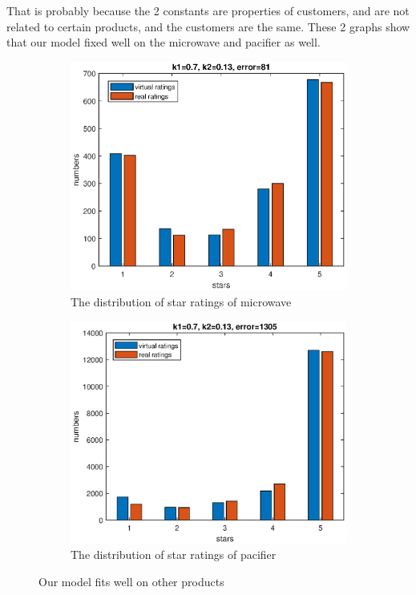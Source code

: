 \documentclass[12pt]{article}  %
\begin{document}
That is probably because the 2 constants are properties of customers, and are not related to certain products, and the customers are the same. These 2 graphs show that our model fixed well on the microwave and pacifier as well.


\begin{figure}[H]
  \centering
  \begin{subfigure}{.5\textwidth}
    \centering
    \includegraphics[width=\linewidth]{Q4picture/microwave}
    \caption{The distribution of star ratings of microwave}
    \label{fig:}
  \end{subfigure}%
  \begin{subfigure}{.5\textwidth}
    \centering
    \includegraphics[width=\linewidth]{Q4picture/pacifier}
    \caption{The distribution of star ratings of pacifier}
    \label{fig:}
  \end{subfigure}
  \caption{Our model fits well on other products}
  \label{fig:}
\end{figure}
\end{document}
